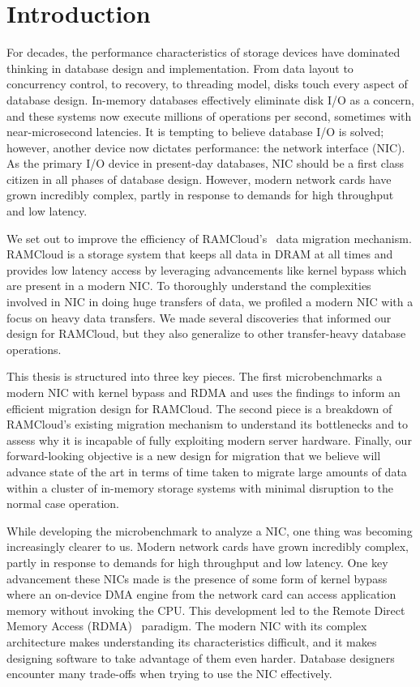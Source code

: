 
\chapter{Introduction}

For decades, the performance characteristics of storage devices have dominated
 thinking in database design and implementation. From data layout to
concurrency control, to recovery, to threading model, disks touch every aspect
of database design. In-memory databases effectively eliminate disk I/O as a
concern, and these systems now execute millions of operations per second,
sometimes with near-microsecond latencies.  It is tempting to believe 
database I/O is solved; however, another device now dictates
performance: the network interface (NIC). As the primary I/O device in present-day databases,
NIC should be a first class citizen in all phases of database design.
However, modern network cards have grown incredibly complex, partly in response
to demands for high throughput and low latency.

We set out to improve the efficiency of RAMCloud's~\cite{ramcloud} data migration mechanism. 
RAMCloud is a storage system that keeps all data in DRAM at all times and provides low latency access by
leveraging advancements like kernel bypass which are present in a modern NIC.
To thoroughly understand the complexities involved in NIC in doing huge
transfers of data, we profiled a modern NIC with a focus on heavy data transfers.
 We made several discoveries that informed our design for RAMCloud,
 but they also generalize to other transfer-heavy database operations. 

This thesis is structured into three key pieces. The first microbenchmarks a modern NIC 
with kernel bypass and RDMA and uses the findings to inform an efficient   migration design for RAMCloud.
The second piece is a breakdown of RAMCloud’s existing migration mechanism to understand its bottlenecks
and to assess why it is incapable of fully exploiting modern server hardware. 
Finally, our forward-looking objective is a new design for migration that we believe will advance state of the art
in terms of time taken to migrate large amounts of data within a cluster of in-memory storage systems
with minimal disruption to the normal case operation.

While developing the microbenchmark to analyze a NIC, one thing was becoming increasingly clearer to us.
Modern network cards have grown incredibly complex, partly in response to
demands for high throughput and low latency. One key advancement these NICs made 
is the presence of some form of kernel bypass where an on-device DMA engine from the network card 
can access application memory without invoking the CPU. This development led to the Remote 
Direct Memory Access (RDMA)~\cite{rdmapatent} paradigm. The modern NIC with its complex architecture
makes understanding its characteristics difficult, and it makes designing software to take advantage
of them even harder. Database designers encounter many trade-offs when trying to use the NIC effectively.

